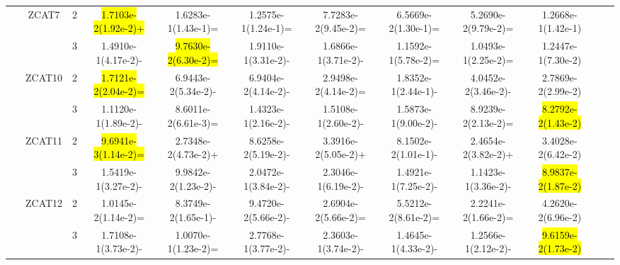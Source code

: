 \documentclass[a4paper,fleqn]{cas-dc}
\newcommand{\highlight}[1]{
	\begingroup
	\sethlcolor{Seashell}%
	\hl{#1}%
	\endgroup
}
\begin{document}
\begin{sloppypar}
\begin{table}[ht]
{\begin{tabular}{cccccccccccc}
					
					
					\multirow{8}{*}{~}&\multirow{2}{*}{ZCAT7}&2 &\highlight{1.7103e-2(1.92e-2)+}	&1.6283e-1(1.43e-1)=	&1.2575e-1(1.24e-1)=	&7.7283e-2(9.45e-2)=	&6.5669e-2(1.30e-1)=	&5.2690e-2(9.79e-2)=	&1.2668e-1(1.42e-1)\\
					
					\multirow{8}{*}{~}&\multirow{2}{*}{~}&3	&1.4910e-1(4.17e-2)-	&\highlight{9.7630e-2(6.30e-2)=}	&1.9110e-1(3.31e-2)-	&1.6866e-1(3.71e-2)-	&1.1592e-1(5.78e-2)=	&1.0493e-1(2.25e-2)=	&1.2447e-1(7.30e-2)\\
					
					
					
					
					
					\multirow{8}{*}{~}&\multirow{2}{*}{ZCAT10}&2	&\highlight{1.7121e-2(2.04e-2)=}	&6.9443e-2(5.34e-2)-	&6.9404e-2(4.14e-2)-	&2.9498e-2(4.14e-2)=	&1.8352e-1(2.44e-1)-	&4.0452e-2(3.46e-2)-	&2.7869e-2(2.99e-2)\\
					
					\multirow{8}{*}{~}&\multirow{2}{*}{~}&3	&1.1120e-1(1.89e-2)-	&8.6011e-2(6.61e-3)=	&1.4323e-1(2.16e-2)-	&1.5108e-1(2.60e-2)-	&1.5873e-1(9.00e-2)-	&8.9239e-2(2.13e-2)=	&\highlight{8.2792e-2(1.43e-2)}\\
					\hline
					
					
					
					
					\multirow{6}{*}{Disconnected}&\multirow{2}{*}{ZCAT11}&2 &\highlight{9.6941e-3(1.14e-2)=} &2.7348e-2(4.73e-2)+	&8.6258e-2(5.19e-2)-	&3.3916e-2(5.05e-2)+	&8.1502e-2(1.01e-1)-	&2.4654e-2(3.82e-2)+	&3.4028e-2(6.42e-2)\\
					
					\multirow{6}{*}{~}&\multirow{2}{*}{~}&3 &1.5419e-1(3.27e-2)- &9.9842e-2(1.23e-2)-	&2.0472e-1(3.84e-2)-	&2.3046e-1(6.19e-2)-	&1.4921e-1(7.25e-2)-	&1.1423e-1(3.36e-2)-	&\highlight{8.9837e-2(1.87e-2)}\\
					
					
					
					
					
					
					\multirow{6}{*}{~}&\multirow{2}{*}{ZCAT12}&2	&1.0145e-2(1.14e-2)=	&8.3749e-2(1.65e-1)-	&9.4720e-2(5.66e-2)-	&2.6904e-2(5.66e-2)=	&5.5212e-2(8.61e-2)=	&2.2241e-2(1.66e-2)=	&4.2620e-2(6.96e-2)\\
					
					\multirow{6}{*}{~}&\multirow{2}{*}{~}&3		&1.7108e-1(3.73e-2)-	&1.0070e-1(1.23e-2)=	&2.7768e-1(3.77e-2)-	&2.3603e-1(3.74e-2)-	&1.4645e-1(4.33e-2)-	&1.2566e-1(2.12e-2)-	&\highlight{9.6159e-2(1.73e-2)}\\
					

\end{tabular}}
\end{table}
\end{sloppypar}
\end{document}
